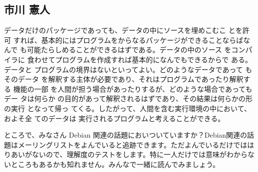 \documentclass[mingoth,a4paper]{jsarticle}
\begin{document}
\begin{multicols}{2}
{\subsection{市川 憲人}

データだけのパッケージであっても、データの中にソースを埋めこむこ とを許可
すれば、基本的にはプログラムをからなるパッケージができることならばなんで
も可能たらしめることができるはずである。データの中のソース をコンパイラに
食わせてプログラムを作成すれば基本的になんでもできるからで ある。データと
プログラムの境界はないといってよい。どのようなデータであって もそのデータ
を解釈する主体が必要であり、それはプログラムであったり解釈する 機能の一部
を人間が担う場合があったりするが、どのような場合であってもデー タは何らか
の目的があって解釈されるはずであり、その結果は何らかの形の実行 となって帰っ
てくる。したがって、人間を含む実行環境の中において、およそ全 てのデータは
実行されるプログラムと考えることができる。


} 
\end{multicols}


ところで、みなさん Debian 関連の話題においついていますか？Debian関連の話
題はメーリングリストをよんでいると追跡できます。ただよんでいるだけではは
りあいがないので、理解度のテストをします。特に一人だけでは意味がわからな
いところもあるかも知れません。みんなで一緒に読んでみましょう。
\end{document}
